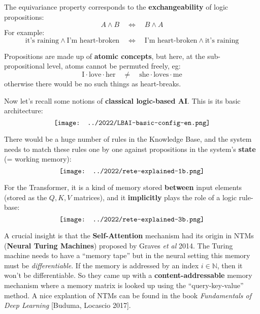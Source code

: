 \begin{preview}
\begin{minipage}{\textwidth}
The equivariance property corresponds to the \textbf{exchangeability} of logic propositions:
\begin{equation}
A \wedge B \quad \Leftrightarrow \quad B \wedge A
\end{equation}
For example:
\begin{equation}
\mbox{it's raining} \wedge \mbox{I'm heart-broken} \quad \Leftrightarrow \quad \mbox{I'm heart-broken} \wedge \mbox{it's raining}
\end{equation}

Propositions are made up of \textbf{atomic concepts}, but here, at the sub-propositional level, atoms cannot be permuted freely, eg:
\begin{equation}
\mbox{I} \cdot \mbox{love} \cdot \mbox{her} \quad \neq \quad \mbox{she} \cdot \mbox{loves} \cdot \mbox{me}
\end{equation}
otherwise there would be no such things as heart-breaks.

Now let's recall some notions of \textbf{classical logic-based AI}.  This is its basic architecture:
\begin{equation}
\vcenter{\hbox{\texttt{[image: ../2022/LBAI-basic-config-en.png]}}}
\end{equation}

There would be a huge number of rules in the Knowledge Base, and the system needs to match these rules one by one against propositions in the system's \textbf{state} (= working memory):
\begin{equation}
\vcenter{\hbox{\texttt{[image: ../2022/rete-explained-1b.png]}}}
\end{equation}

For the Transformer, it is a kind of memory stored \textbf{between} input elements (stored as the $Q, K, V$ matrices), and it \textbf{implicitly} plays the role of a logic rule-base:
\begin{equation}
\label{fig:self-attention-as-Rete}
\vcenter{\hbox{\texttt{[image: ../2022/rete-explained-3b.png]}}}
\end{equation}

A crucial insight is that the \textbf{Self-Attention} mechanism had its origin in NTMs (\textbf{Neural Turing Machines}) proposed by Graves \textit{et al} 2014.  The Turing machine needs to have a ``memory tape'' but in the neural setting this memory must be \textit{differentiable}.  If the memory is addressed by an index $i \in \mathbb{N}$, then it won't be differentiable.  So they came up with a \textbf{content-addressable} memory mechanism where a memory matrix is looked up using the ``query-key-value'' method.  A nice explantion of NTMs can be found in the book \textit{Fundamentals of Deep Learning} [Buduma, Locascio 2017].


\end{minipage}
\end{preview}

